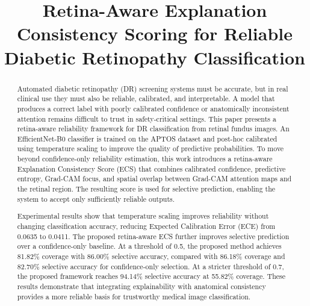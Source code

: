 \documentclass[conference]{IEEEtran}
\begin{document}
\title{Retina-Aware Explanation Consistency Scoring for Reliable Diabetic Retinopathy Classification}

\author{

}

\maketitle

\begin{abstract}
Automated diabetic retinopathy (DR) screening systems must be accurate, but in real clinical use they must also be reliable, calibrated, and interpretable. A model that produces a correct label with poorly calibrated confidence or anatomically inconsistent attention remains difficult to trust in safety-critical settings. This paper presents a retina-aware reliability framework for DR classification from retinal fundus images. An EfficientNet-B0 classifier is trained on the APTOS dataset and post-hoc calibrated using temperature scaling to improve the quality of predictive probabilities. To move beyond confidence-only reliability estimation, this work introduces a retina-aware Explanation Consistency Score (ECS) that combines calibrated confidence, predictive entropy, Grad-CAM focus, and spatial overlap between Grad-CAM attention maps and the retinal region. The resulting score is used for selective prediction, enabling the system to accept only sufficiently reliable outputs.

Experimental results show that temperature scaling improves reliability without changing classification accuracy, reducing Expected Calibration Error (ECE) from 0.0635 to 0.0411. The proposed retina-aware ECS further improves selective prediction over a confidence-only baseline. At a threshold of 0.5, the proposed method achieves 81.82\% coverage with 86.00\% selective accuracy, compared with 86.18\% coverage and 82.70\% selective accuracy for confidence-only selection. At a stricter threshold of 0.7, the proposed framework reaches 94.14\% selective accuracy at 55.82\% coverage. These results demonstrate that integrating explainability with anatomical consistency provides a more reliable basis for trustworthy medical image classification.
\end{abstract}
\end{document}
